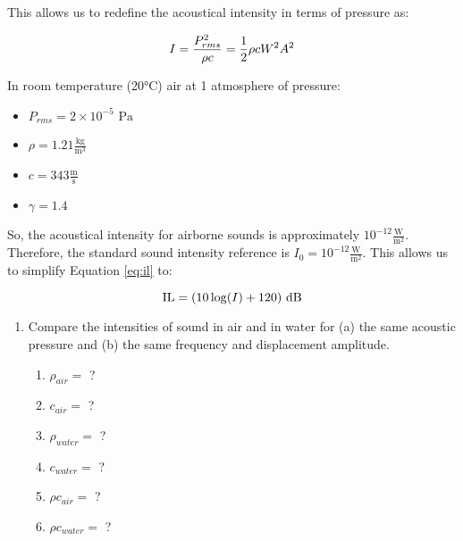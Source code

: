 
    This allows us to redefine the acoustical intensity in terms of pressure as:

    \begin{equation} \labeq{i_pressure}
        I = \frac{P_{rms}^2}{\rho c} = \frac{1}{2}\rho c W^2 A^2 
    \end{equation}


    In room temperature (20°C) air at 1 atmosphere of pressure:

    \begin{itemize}
        \item $P_{rms} = 2 \times 10^{-5} \text{ Pa}$
        \item $\rho = 1.21 \frac{\text{kg}}{\text{m}^3}$
        \item $c = 343 \frac{\text{m}}{\text{s}}$
        \item $\gamma = 1.4$
    \end{itemize}

    So, the acoustical intensity for airborne sounds is approximately $10^{-12} \frac{\text{W}}{\text{m}^2}$.
    Therefore, the standard sound intensity reference is $I_0 = 10^{-12} \frac{\text{W}}{\text{m}^2}$.
    This allows us to simplify Equation \ref{eq:il} to:

    \begin{equation} \labeq{il_air}
        \text{IL} = (10\log(I) + 120) \text{ dB}
    \end{equation}

    \begin{kaobox}[frametitle=Homework 2]
        \begin{enumerate}
            \item Compare the intensities of sound in air and in water for (a) the same acoustic pressure and (b) the same frequency and displacement amplitude.
                \begin{enumerate}
                \item $\rho_{air} =$ ?
                \item $c_{air} =$ ?
                \item $\rho_{water} =$ ?
                \item $c_{water} =$ ?
                \item $\rho c_{air} =$ ?
                \item $\rho c_{water} =$ ?
                \end{enumerate}
        \end{enumerate}
    \end{kaobox}

